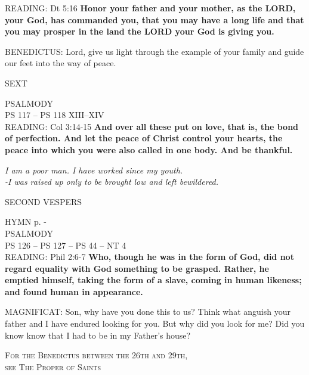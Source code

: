 \noindent\small{\uppercase{READING:}}    Dt 5:16 \textbf{    Honor your father and your mother, as the LORD, your God, has commanded you, that you may have a long life and that you may prosper in the land the LORD your God is giving you. \\}

\noindent\small{\uppercase{BENEDICTUS:}}	Lord, give us light through the example of your family and guide our feet into the way of peace.\\

\begin{flushleft}\normalsize{\uppercase{SEXT\\}}\end{flushleft}
\noindent\small{\uppercase{PSALMODY}\\}
\uppercase{Ps 117 -- Ps 118 XIII--XIV}\vspace{0.5em}\\

\noindent\small{\uppercase{READING:}}    Col 3:14-15 \textbf{    And over all these put on love, that is, the bond of perfection. And let the peace of Christ control your hearts, the peace into which you were also called in one body. And be thankful.}
\begin{center}\textit{I am a poor man. I have worked since my youth.\\
-I was raised up only to be brought low and left bewildered.}\end{center}

\begin{flushleft}\normalsize{\uppercase{SECOND VESPERS\\}}\end{flushleft}
\small{\uppercase{HYMN} p. \pageref{christmas:firstHymn}-\pageref{christmas:lastHymn}\\}
\noindent\small{\uppercase{PSALMODY}\\}
\uppercase{Ps 126 -- Ps 127 -- Ps 44 -- NT 4}\vspace{0.5em}\\

\noindent\small{\uppercase{READING:}}    Phil 2:6-7 \textbf{    Who, though he was in the form of God, did not regard equality with God something to be grasped. Rather, he emptied himself, taking the form of a slave, coming in human likeness; and found human in appearance.\\}

\noindent\small{\uppercase{MAGNIFICAT:}}	Son, why have you done this to us? Think what anguish your father and I have endured looking for you. But why did you look for me? Did you know know that I had to be in my Father's house?\\

\begin{center}\noindent\small{\textsc{For the Benedictus between the 26th and 29th,\\ see The Proper of Saints}\\}
\end{center}